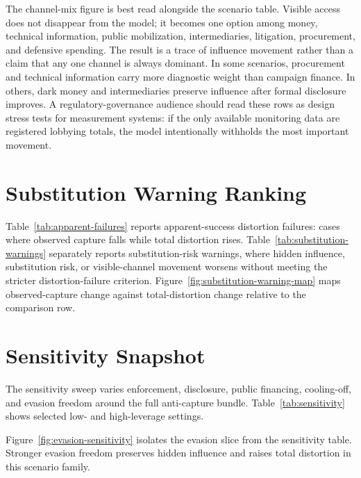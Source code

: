 The channel-mix figure is best read alongside the scenario table. Visible access does not disappear from the model; it becomes one option among money, technical information, public mobilization, intermediaries, litigation, procurement, and defensive spending. The result is a trace of influence movement rather than a claim that any one channel is always dominant. In some scenarios, procurement and technical information carry more diagnostic weight than campaign finance. In others, dark money and intermediaries preserve influence after formal disclosure improves. A regulatory-governance audience should read these rows as design stress tests for measurement systems: if the only available monitoring data are registered lobbying totals, the model intentionally withholds the most important movement.

\section{Substitution Warning Ranking}

Table~\ref{tab:apparent-failures} reports apparent-success distortion failures: cases where observed capture falls while total distortion rises. Table~\ref{tab:substitution-warnings} separately reports substitution-risk warnings, where hidden influence, substitution risk, or visible-channel movement worsens without meeting the stricter distortion-failure criterion. Figure~\ref{fig:substitution-warning-map} maps observed-capture change against total-distortion change relative to the comparison row.







\section{Sensitivity Snapshot}

The sensitivity sweep varies enforcement, disclosure, public financing, cooling-off, and evasion freedom around the full anti-capture bundle. Table~\ref{tab:sensitivity} shows selected low- and high-leverage settings.



Figure~\ref{fig:evasion-sensitivity} isolates the evasion slice from the sensitivity table. Stronger evasion freedom preserves hidden influence and raises total distortion in this scenario family.


